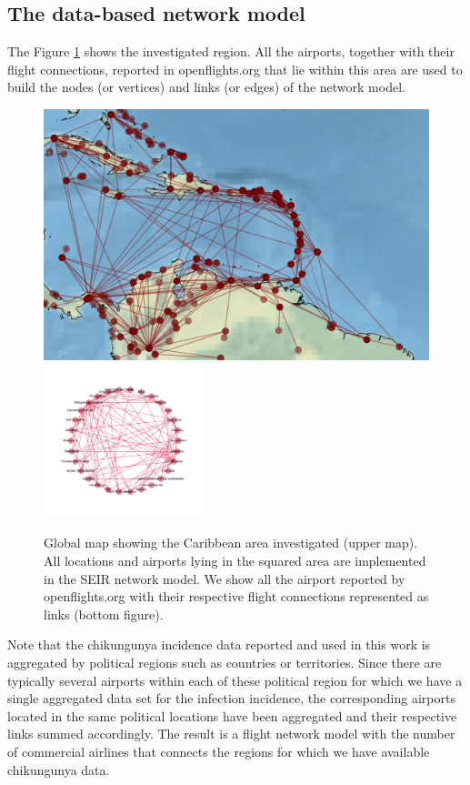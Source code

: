 \documentclass[10pt,a4paper]{article}
\begin{document}
\subsection*{The data-based network model}
The Figure \ref{fig:world-map} shows the investigated region. All the airports, together with their flight connections, reported in openflights.org \citep{openflights} that lie within this area are used to build the nodes (or vertices) and links (or edges) of the network model.  
%
\begin{figure}[ht]
\centering
\includegraphics[width=2.3 in]{./figuras/caribbean_region} \hspace{.5cm}
\includegraphics[width=4.7cm]{./figuras/simple_network_model_circular_and_labels_red_scen_A}
\caption{\small Global map showing the Caribbean area investigated (upper map). All locations and airports lying in the squared area are implemented in the SEIR network model. We show all the airport reported by openflights.org with their respective flight connections represented as links (bottom figure).}
\label{fig:world-map}
\end{figure}
%
Note that the chikungunya incidence data reported and used in this work is aggregated by political regions such as countries or territories. Since there are typically several airports within each of these political region for which we have a single aggregated data set for the infection incidence, the corresponding airports located in the same political locations have been aggregated and their respective links summed accordingly. The result is a flight network model with the number of commercial airlines that connects the regions for which we have available chikungunya data. 
\end{document}
